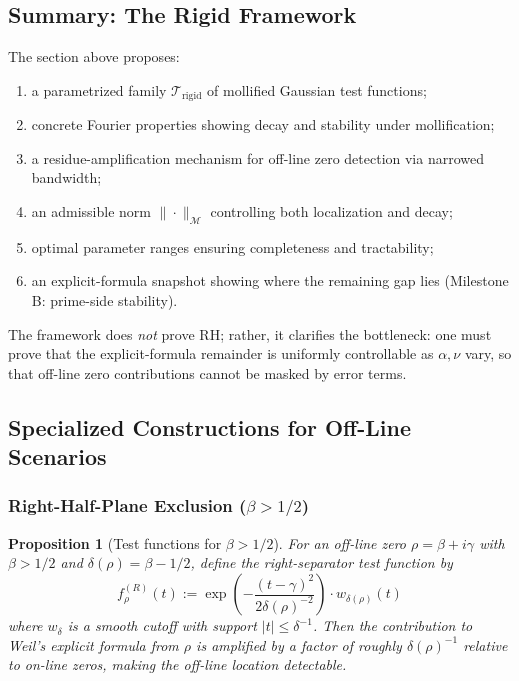 \documentclass[11pt]{article}
\theoremstyle{plain}
\newtheorem{proposition}[theorem]{Proposition}
\theoremstyle{definition}
\theoremstyle{remark}
\begin{document}
\subsection*{Summary: The Rigid Framework}

The section above proposes:
\begin{enumerate}
  \item a parametrized family $\mathcal{T}_{\mathrm{rigid}}$ of mollified Gaussian test functions;
  \item concrete Fourier properties showing decay and stability under mollification;
  \item a residue-amplification mechanism for off-line zero detection via narrowed bandwidth;
  \item an admissible norm $\|\cdot\|_{\mathcal{M}}$ controlling both localization and decay;
  \item optimal parameter ranges ensuring completeness and tractability;
  \item an explicit-formula snapshot showing where the remaining gap lies (Milestone B: prime-side stability).
\end{enumerate}

The framework does \emph{not} prove RH; rather, it clarifies the bottleneck: one must prove that
the explicit-formula remainder is uniformly controllable as $\alpha,\nu$ vary, so that off-line
zero contributions cannot be masked by error terms.

\subsection{Specialized Constructions for Off-Line Scenarios}

\subsubsection{Right-Half-Plane Exclusion ($\beta>1/2$)}

\begin{proposition}[Test functions for $\beta>1/2$]
For an off-line zero $\rho=\beta+i\gamma$ with $\beta>1/2$ and $\delta(\rho)=\beta-1/2$,
define the \emph{right-separator} test function by
\[
f_{\rho}^{(R)}(t) := \exp\left(-\frac{(t-\gamma)^2}{2\delta(\rho)^{-2}}\right) \cdot w_{\delta(\rho)}(t)
\]
where $w_{\delta}$ is a smooth cutoff with support $|t|\le\delta^{-1}$.
Then the contribution to Weil's explicit formula from $\rho$ is amplified by a factor of roughly $\delta(\rho)^{-1}$
relative to on-line zeros, making the off-line location detectable.
\end{proposition}
\end{document}
